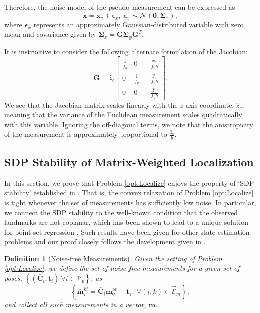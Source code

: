 \documentclass[lettersize,journal]{IEEEtran}
\newcommand{\EdgeSet}{\vec{\bm{\mathcal{E}}}}
\newcommand{\VertSetP}{\bm{\mathcal{V}}_p}
\newtheorem{definition}[theorem]{Definition}
\begin{document}
Therefore, the noise model of the pseudo-measurement can be expressed as
\begin{equation}
	 \hat{\bm{x}} = \bm{x}_c + \bm{\epsilon}_x, ~ \bm{\epsilon}_x \sim \mathcal{N}(\bm{0}, \bm{\Sigma}_x),
\end{equation}
where $ \bm{\epsilon}_x $ represents an approximately Gaussian-distributed variable with zero mean and covariance given by $ \bm{\Sigma}_x = \bm{G}\bm{\Sigma}_y \bm{G}^T $.

It is instructive to consider the following alternate formulation of the Jacobian:
\begin{equation}
	\bm{G} =\hat{z}_c\begin{bmatrix}
		\frac{1}{f_u} & 0 & -\frac{\hat{x}_c}{f_u b } \\
		0 & \frac{1}{f_v } & -\frac{\hat{y}_c}{f_u b } \\
		0 & 0 & -\frac{\hat{z}_c}{f_u b}
	\end{bmatrix}.
\end{equation}
We see that the Jacobian matrix scales linearly with the $z$-axis coordinate, $\hat{z}_c$, meaning that the variance of the Euclidean measurement scales quadratically with this variable. Ignoring the off-diagonal terms, we note that the anistropicity of the measurement is approximately proportional to $\frac{\hat{z}_c}{b}$.

\subsection{SDP Stability of Matrix-Weighted Localization}\label{SM:SDPStability}

In this section, we prove that Problem \eqref{opt:Localize} enjoys the property of `SDP stability' established in \cite{cifuentesLocalStabilitySemidefinite2022}. That is, the convex relaxation of Problem \eqref{opt:Localize} is tight whenever the set of measurements has sufficiently low noise. In particular, we connect the SDP stability to the well-known condition that the observed landmarks are not coplanar, which has been shown to lead to a unique solution for point-set regression \cite{arunLeastSquaresFittingTwo1987}. Such results have been given for other state-estimation problems \cite{rosenSESyncCertifiablyCorrect2019, tianDistributedCertifiablyCorrect2021} and our proof closely follows the development given in \cite{wiseCertifiablyOptimalMonocular2020}.

\begin{definition}[Noise-free Measurements]
	Given the setting of Problem \eqref{opt:Localize}, we define the set of \emph{noise-free measurements} for a given set of poses, $\left\{(\bar{\bm{C}}_{i}, \bar{\bm{t}}_i) ~ \forall i \in \VertSetP \right\}$, as
	\begin{equation}
		\left\{\bar{\bm{m}}_i^{ki} = \bar{\bm{C}}_{i} \bm{m}_0^{k0} - \bar{\bm{t}}_i,~ \forall (i,k)\in \EdgeSet_m\right\},
	\end{equation}
	and collect all such measurements in a vector, $\bar{\bm{m}}$.
\end{definition}
\end{document}
